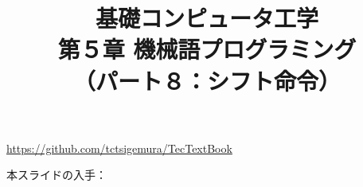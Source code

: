 \documentclass[handout]{beamer}        %
\begin{document}
\title{基礎コンピュータ工学\\第５章 機械語プログラミング\\
       （パート８：シフト命令）}
\date{}

\begin{frame}
  \titlepage
  \centerline{\url{https://github.com/tctsigemura/TecTextBook}}
  \vfill
  \centerline{本スライドの入手：
    }
\end{frame}

\end{document}
